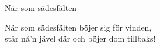 \begin{song}{När som sädesfälten}

	
	När som sädesfälten böjer sig för vinden,\\
	står nå'n jävel där och böjer dom tillbaks!
	
\end{song}
